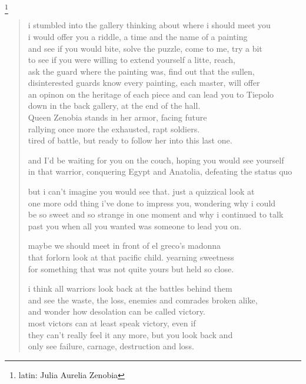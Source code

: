 
\footnote{latin: Julia Aurelia Zenobia}
\begin{verse}
i stumbled into the gallery thinking about where i should meet you \\
i would offer you a riddle, a time and the name of a painting \\
and see if you would bite, solve the puzzle, come to me, try a bit \\
to see if you were willing to extend yourself a litte, reach, \\
ask the guard where the painting was, find out that the sullen,
disinterested guards know every painting, each master, will offer \\
an opinon on the heritage of each piece and can lead you to Tiepolo \\
down in the back gallery, at the end of the hall. \\
Queen Zenobia stands in her armor, facing future \\
rallying once more the exhausted, rapt soldiers. \\
tired of battle, but ready to follow her into this last one.

and I'd be waiting for you on the couch, hoping you would see yourself \\
in that warrior, conquering Egypt and Anatolia, defeating the status quo 

but i can't imagine you would see that. just a quizzical look at \\
one more odd thing i've done to impress you, wondering why i could \\
be so sweet and so strange in one moment and why i continued to talk \\
past you when all you wanted was someone to lead you on. 

maybe we should meet in front of el greco's madonna \\
that forlorn look at that pacific child. yearning sweetness \\
for something that was not quite yours but held so close. 

i think all warriors look back at the battles behind them \\
and see the waste, the loss, enemies and comrades broken alike, \\
and wonder how desolation can be called victory. \\
most victors can at least speak victory, even if \\
they can't really feel it any more, but you look back and \\
only see failure, carnage, destruction and loss.


\end{verse}
